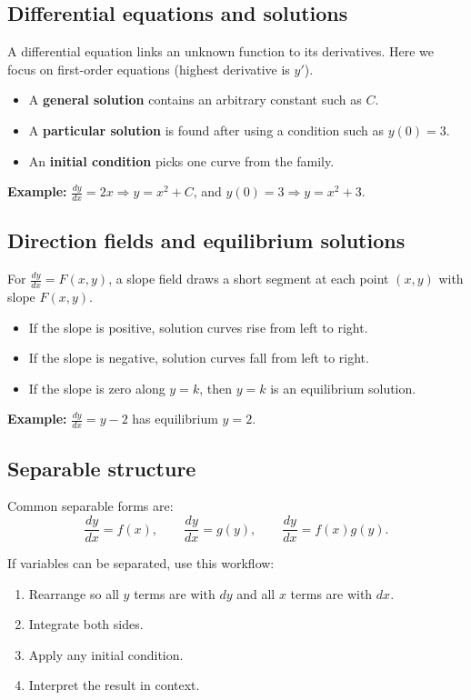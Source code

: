 \subsection{Differential equations and solutions}
A differential equation links an unknown function to its derivatives. Here we focus on first-order equations (highest derivative is $y'$).

\begin{itemize}[leftmargin=*]
  \item A \textbf{general solution} contains an arbitrary constant such as $C$.
  \item A \textbf{particular solution} is found after using a condition such as $y(0)=3$.
  \item An \textbf{initial condition} picks one curve from the family.
\end{itemize}

\textbf{Example:} $\frac{dy}{dx}=2x \Rightarrow y=x^2+C$, and $y(0)=3 \Rightarrow y=x^2+3$.

\subsection{Direction fields and equilibrium solutions}
For $\frac{dy}{dx}=F(x,y)$, a slope field draws a short segment at each point $(x,y)$ with slope $F(x,y)$.

\begin{itemize}[leftmargin=*]
  \item If the slope is positive, solution curves rise from left to right.
  \item If the slope is negative, solution curves fall from left to right.
  \item If the slope is zero along $y=k$, then $y=k$ is an equilibrium solution.
\end{itemize}

\textbf{Example:} $\frac{dy}{dx}=y-2$ has equilibrium $y=2$.

\subsection{Separable structure}
Common separable forms are:
\[
\frac{dy}{dx} = f(x), \qquad
\frac{dy}{dx} = g(y), \qquad
\frac{dy}{dx} = f(x)g(y).
\]

If variables can be separated, use this workflow:
\begin{enumerate}[leftmargin=*]
  \item Rearrange so all $y$ terms are with $dy$ and all $x$ terms are with $dx$.
  \item Integrate both sides.
  \item Apply any initial condition.
  \item Interpret the result in context.
\end{enumerate}

